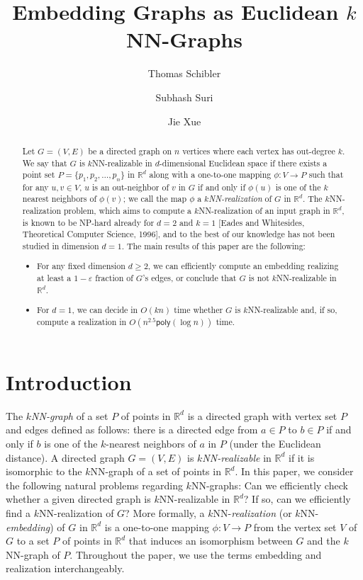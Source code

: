 \documentclass[english]{lipics-v2021}
\title{Embedding Graphs as Euclidean \texorpdfstring{$k$}{k}NN-Graphs}
\author{Thomas Schibler}{University of California, Santa Barbara, CA, USA}{tschibler@ucsb.edu}{https://orcid.org/0009-0008-2966-9468}{}
\author{Subhash Suri}{University of California Santa Barbara, CA, USA}{suri@ucsb.edu}{https://orcid.org/0000-0002-5668-7521}{}
\author{Jie Xue}{New York University Shanghai, China}{jiexue@nyu.edu}{https://orcid.org/0000-0001-7015-1988}{}
\begin{document}
\maketitle

\begin{abstract}
Let $G=(V,E)$ be a directed graph on $n$ vertices where each vertex has out-degree $k$.
We say that $G$ is $k$NN-realizable in $d$-dimensional Euclidean space if there exists a point set $P = \{p_1, p_2, \ldots, p_n\}$ in $\mathbb{R}^d$ along with a one-to-one mapping $\phi: V \rightarrow P$ such that for any $u,v \in V$, $u$ is an out-neighbor of $v$ in $G$ if and only if $\phi(u)$ is one of the $k$ nearest neighbors of $\phi(v)$; we call the map $\phi$ a \textit{$k$NN-realization} of $G$ in $\mathbb{R}^d$.
The $k$NN-realization problem, which aims to compute a $k$NN-realization of an input graph in $\mathbb{R}^d$, is known to be NP-hard already for $d=2$ and $k=1$ [Eades and Whitesides, Theoretical Computer Science, 1996], and to the best of our knowledge has not been studied in dimension $d=1$. The main results of this paper are the following:
\smallskip
\begin{itemize}
    \item For any fixed dimension $d \geq 2$, we can efficiently compute an embedding realizing at least a $1 - \varepsilon$ fraction of $G$'s edges, or conclude that $G$ is not $k$NN-realizable in $\mathbb{R}^d$.
    \smallskip
    \item For $d=1$, we can decide in $O(kn)$ time whether $G$ is $k$NN-realizable and, if so, compute a realization in $O(n^{2.5} \mathsf{poly}(\log n))$ time.
\end{itemize}
\end{abstract}

\section{Introduction}

The \textit{$k$NN-graph} of a set $P$ of points in $\mathbb{R}^d$ is a directed graph with vertex set $P$ and edges defined as follows: there is a directed edge from $a \in P$ to $b \in P$ if and only if $b$ is one of the $k$-nearest neighbors of $a$ in $P$ (under the Euclidean distance).
A directed graph $G = (V, E)$ is \textit{$k$NN-realizable} in $\mathbb{R}^d$ if it is isomorphic to the $k$NN-graph of a set of points in $\mathbb{R}^d$.
In this paper, we consider the following natural problems regarding $k$NN-graphs:
Can we efficiently check whether a given directed graph is $k$NN-realizable in $\mathbb{R}^d$?
If so, can we efficiently find a $k$NN-realization of $G$?
More formally, a $k$NN-\emph{realization} (or $k$NN-\emph{embedding}) of $G$ in $\mathbb{R}^d$ is a one-to-one mapping $\phi: V \rightarrow P$ from the vertex set $V$ of $G$ to a set $P$ of points in $\mathbb{R}^d$ that induces an isomorphism between $G$ and the $k$NN-graph of $P$.
Throughout the paper, we use the terms embedding and realization interchangeably.
\end{document}
